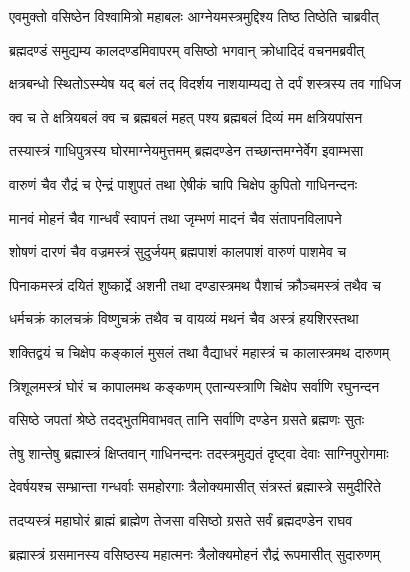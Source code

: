 
\twolineshloka
{एवमुक्तो वसिष्ठेन विश्वामित्रो महाबलः}
{आग्नेयमस्त्रमुद्दिश्य तिष्ठ तिष्ठेति चाब्रवीत्} %

\twolineshloka
{ब्रह्मदण्डं समुद्यम्य कालदण्डमिवापरम्}
{वसिष्ठो भगवान् क्रोधादिदं वचनमब्रवीत्} %

\twolineshloka
{क्षत्रबन्धो स्थितोऽस्म्येष यद् बलं तद् विदर्शय}
{नाशयाम्यद्य ते दर्पं शस्त्रस्य तव गाधिज} %

\twolineshloka
{क्व च ते क्षत्रियबलं क्व च ब्रह्मबलं महत्}
{पश्य ब्रह्मबलं दिव्यं मम क्षत्रियपांसन} %

\twolineshloka
{तस्यास्त्रं गाधिपुत्रस्य घोरमाग्नेयमुत्तमम्}
{ब्रह्मदण्डेन तच्छान्तमग्नेर्वेग इवाम्भसा} %

\twolineshloka
{वारुणं चैव रौद्रं च ऐन्द्रं पाशुपतं तथा}
{ऐषीकं चापि चिक्षेप कुपितो गाधिनन्दनः} %

\twolineshloka
{मानवं मोहनं चैव गान्धर्वं स्वापनं तथा}
{जृम्भणं मादनं चैव संतापनविलापने} %

\twolineshloka
{शोषणं दारणं चैव वज्रमस्त्रं सुदुर्जयम्}
{ब्रह्मपाशं कालपाशं वारुणं पाशमेव च} %

\twolineshloka
{पिनाकमस्त्रं दयितं शुष्कार्द्रे अशनी तथा}
{दण्डास्त्रमथ पैशाचं क्रौञ्चमस्त्रं तथैव च} %

\twolineshloka
{धर्मचक्रं कालचक्रं विष्णुचक्रं तथैव च}
{वायव्यं मथनं चैव अस्त्रं हयशिरस्तथा} %

\twolineshloka
{शक्तिद्वयं च चिक्षेप कङ्कालं मुसलं तथा}
{वैद्याधरं महास्त्रं च कालास्त्रमथ दारुणम्} %

\twolineshloka
{त्रिशूलमस्त्रं घोरं च कापालमथ कङ्कणम्}
{एतान्यस्त्राणि चिक्षेप सर्वाणि रघुनन्दन} %

\twolineshloka
{वसिष्ठे जपतां श्रेष्ठे तदद्भुतमिवाभवत्}
{तानि सर्वाणि दण्डेन ग्रसते ब्रह्मणः सुतः} %

\twolineshloka
{तेषु शान्तेषु ब्रह्मास्त्रं क्षिप्तवान् गाधिनन्दनः}
{तदस्त्रमुद्यतं दृष्ट्वा देवाः साग्निपुरोगमाः} %

\twolineshloka
{देवर्षयश्च सम्भ्रान्ता गन्धर्वाः समहोरगाः}
{त्रैलोक्यमासीत् संत्रस्तं ब्रह्मास्त्रे समुदीरिते} %

\twolineshloka
{तदप्यस्त्रं महाघोरं ब्राह्मं ब्राह्मेण तेजसा}
{वसिष्ठो ग्रसते सर्वं ब्रह्मदण्डेन राघव} %

\twolineshloka
{ब्रह्मास्त्रं ग्रसमानस्य वसिष्ठस्य महात्मनः}
{त्रैलोक्यमोहनं रौद्रं रूपमासीत् सुदारुणम्} %

